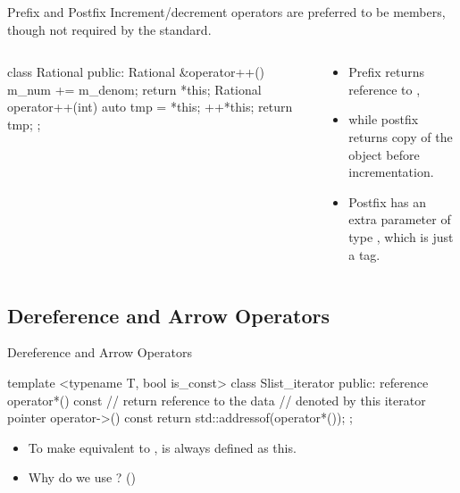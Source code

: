 \begin{frame}[fragile]{Prefix and Postfix}
    Increment/decrement operators are preferred to be members, though not required by the standard.
    \begin{columns}
        \begin{column}{0.5\linewidth}
            \begin{cpp}
class Rational {
 public:
  Rational &operator++() {
    m_num += m_denom;
    return *this;
  }
  Rational operator++(int) {
    auto tmp = *this;
    ++*this;
    return tmp;
  }
};
            \end{cpp}
        \end{column}
        \begin{column}{0.5\linewidth}
            \begin{itemize}
                \item Prefix  returns reference to \ttt{*},
                \item while postfix  returns copy of the object before incrementation.
                \item Postfix  has an extra parameter of type , which is just a tag.
            \end{itemize}
        \end{column}
    \end{columns}
\end{frame}

\subsection{Dereference and Arrow Operators}

\begin{frame}[fragile]{Dereference and Arrow Operators}
    \begin{cpp}
template <typename T, bool is_const>
class Slist_iterator {
 public:
  reference operator*() const {
    // return reference to the data
    // denoted by this iterator
  }
  pointer operator->() const {
    return std::addressof(operator*());
  }
};
    \end{cpp}
    \begin{itemize}
        \item To make  equivalent to ,  is always defined as this.
        \item Why do we use ? ()
    \end{itemize}
\end{frame}

